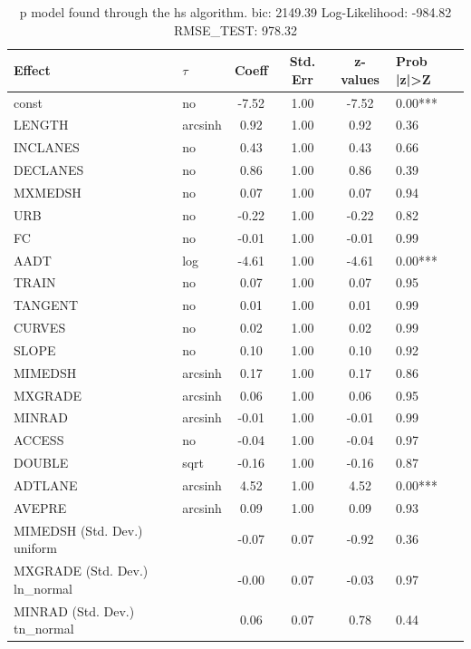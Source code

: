 \begin{table}
	\caption{p model found through the hs algorithm. bic: 2149.39 Log-Likelihood: -984.82 RMSE_TEST: 978.32}
	\begin{center}
		\begin{tabular}{|l|l|c|c|c|l|}
			\hline
			Effect & $\tau$ & Coeff & Std. Err & z-values & Prob |z|>Z \\
			\hline
			const & no & -7.52 & 1.00 & -7.52 & 0.00*** \\
			\hline
			LENGTH & arcsinh & 0.92 & 1.00 & 0.92 & 0.36 \\
			\hline
			INCLANES & no & 0.43 & 1.00 & 0.43 & 0.66 \\
			\hline
			DECLANES & no & 0.86 & 1.00 & 0.86 & 0.39 \\
			\hline
			MXMEDSH & no & 0.07 & 1.00 & 0.07 & 0.94 \\
			\hline
			URB & no & -0.22 & 1.00 & -0.22 & 0.82 \\
			\hline
			FC & no & -0.01 & 1.00 & -0.01 & 0.99 \\
			\hline
			AADT & log & -4.61 & 1.00 & -4.61 & 0.00*** \\
			\hline
			TRAIN & no & 0.07 & 1.00 & 0.07 & 0.95 \\
			\hline
			TANGENT & no & 0.01 & 1.00 & 0.01 & 0.99 \\
			\hline
			CURVES & no & 0.02 & 1.00 & 0.02 & 0.99 \\
			\hline
			SLOPE & no & 0.10 & 1.00 & 0.10 & 0.92 \\
			\hline
			MIMEDSH & arcsinh & 0.17 & 1.00 & 0.17 & 0.86 \\
			\hline
			MXGRADE & arcsinh & 0.06 & 1.00 & 0.06 & 0.95 \\
			\hline
			MINRAD & arcsinh & -0.01 & 1.00 & -0.01 & 0.99 \\
			\hline
			ACCESS & no & -0.04 & 1.00 & -0.04 & 0.97 \\
			\hline
			DOUBLE & sqrt & -0.16 & 1.00 & -0.16 & 0.87 \\
			\hline
			ADTLANE & arcsinh & 4.52 & 1.00 & 4.52 & 0.00*** \\
			\hline
			AVEPRE & arcsinh & 0.09 & 1.00 & 0.09 & 0.93 \\
			\hline
			MIMEDSH (Std. Dev.) uniform &  & -0.07 & 0.07 & -0.92 & 0.36 \\
			\hline
			MXGRADE (Std. Dev.) ln_normal &  & -0.00 & 0.07 & -0.03 & 0.97 \\
			\hline
			MINRAD (Std. Dev.) tn_normal &  & 0.06 & 0.07 & 0.78 & 0.44 \\

\end{tabular}
\end{center}
\end{table}
